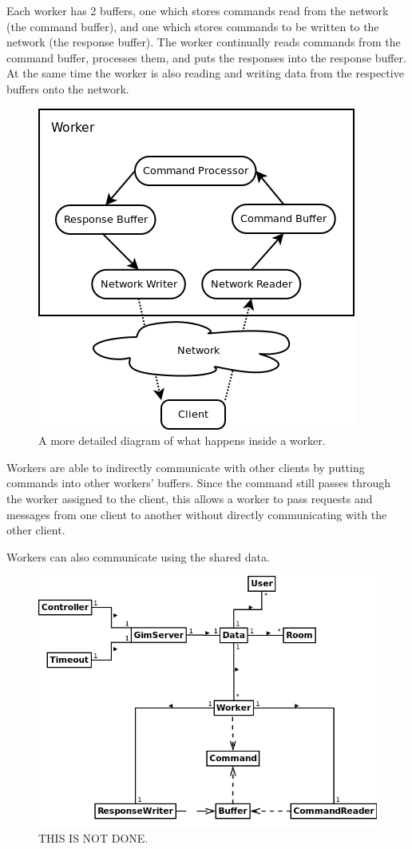 Each worker has 2 buffers, one which stores commands read from the network (the command buffer), and one which stores commands to be written to the network (the response buffer). The worker continually reads commands from the command buffer, processes them, and puts the responses into the response buffer. At the same time the worker is also reading and writing data from the respective buffers onto the network.

\begin{figure}[!h]
    \begin{center}
        \includegraphics[scale=0.75]{chapter2/diagrams/worker_detail.png}
        \caption{A more detailed diagram of what happens inside a worker.}
        \label{WorkersDia}
    \end{center}
\end{figure}

Workers are able to indirectly communicate with other clients by putting commands into other workers' buffers. Since the command still passes through the worker assigned to the client, this allows a worker to pass requests and messages from one client to another without directly communicating with the other client.

Workers can also communicate using the shared data.


\begin{figure}[!h]
    \begin{center}
        \includegraphics[scale=0.65]{chapter2/diagrams/server_uml.png}
        \caption{THIS IS NOT DONE.}
        \label{highLevelDia}
    \end{center}
\end{figure}


